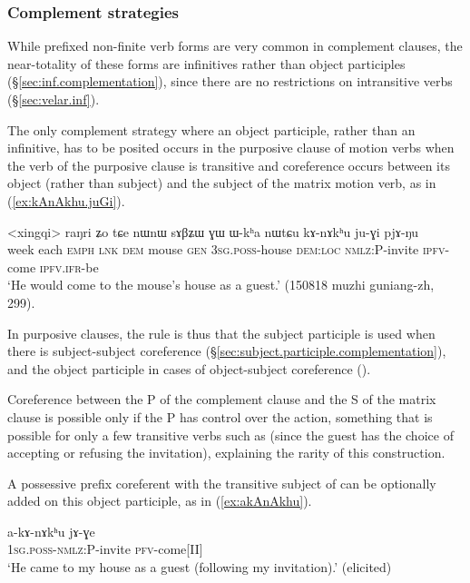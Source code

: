 \subsubsection{Complement strategies} \label{sec:object.participles.complement}
While  prefixed non-finite verb forms are very common in complement clauses, the near-totality of these forms are infinitives rather than object participles (§\ref{sec:inf.complementation}), since there are no restrictions on intransitive verbs (§\ref{sec:velar.inf}).

The only complement strategy where an object participle, rather than an infinitive, has to be posited occurs in the purposive clause of  motion verbs when the verb of the purposive clause is transitive and coreference occurs between its object (rather than subject) and the subject of the matrix motion verb, as  in (\ref{ex:kAnAkhu.juGi}).

\begin{exe}
\ex \label{ex:kAnAkhu.juGi}
\gll <xingqi> raŋri ʑo tɕe nɯnɯ sɤβʑɯ ɣɯ ɯ-kʰa nɯtɕu kɤ-nɤkʰu ju-ɣi pjɤ-ŋu  \\
week each \textsc{emph} \textsc{lnk} \textsc{dem} mouse \textsc{gen} \textsc{3sg.poss}-house \textsc{dem:loc} \textsc{nmlz:P}-invite \textsc{ipfv}-come \textsc{ipfv.ifr}-be \\
\glt `He would come to the mouse's house as a guest.' (150818 muzhi guniang-zh, 299).
\end{exe}

In purposive clauses, the rule is thus that the subject participle is used when there is subject-subject coreference (§\ref{sec:subject.participle.complementation}), and the object participle in cases of object-subject coreference  (\citealt[248]{jacques16complementation}).
 
 Coreference between the P of the complement clause and the S of the matrix clause is possible only if the P has control over the action, something that is possible for only a few transitive verbs such as  (since the guest has the choice of accepting or refusing the invitation), explaining the rarity of this construction. 
 
 A possessive prefix coreferent with the transitive subject of  can be optionally added on this object participle, as in (\ref{ex:akAnAkhu}).

\begin{exe}
\ex \label{ex:akAnAkhu}
\gll a-kɤ-nɤkʰu jɤ-ɣe  \\
 \textsc{1sg.poss-nmlz:P}-invite \textsc{pfv}-come[II] \\
\glt `He came to my house as a guest (following my invitation).' (elicited)
\end{exe}
 
